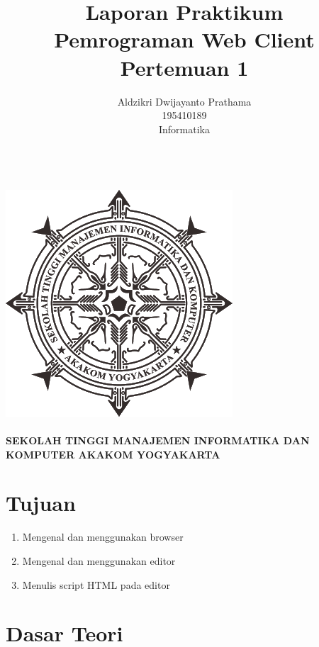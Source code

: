 \documentclass[a4paper,12pt]{article}
\begin{document}
\title{ {\Large Laporan Praktikum}\\ Pemrograman Web Client\\{\Large Pertemuan 1}}

\author{Aldzikri Dwijayanto Prathama 
	\\195410189
	\\Informatika}
\makeatletter
\begin{titlepage}
	\begin{center}
		{\huge \bfseries \@title }\\[14ex]
		\includegraphics[scale=.8]{logo}\\[4ex]
		{\large \@author}\\[12ex]
		{\large \bfseries {SEKOLAH TINGGI MANAJEMEN INFORMATIKA DAN KOMPUTER
				AKAKOM YOGYAKARTA}}
	\end{center}


\end{titlepage}
\makeatother
\newpage
\tableofcontents
\newpage
\section{Tujuan}
\begin{enumerate}
    \item Mengenal dan menggunakan browser
    \item Mengenal dan menggunakan editor
    \item Menulis script HTML pada editor
\end{enumerate}

\section{Dasar Teori}
\end{document}
